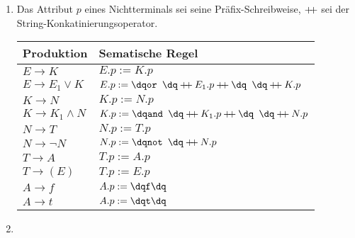 \documentclass[a4paper,10pt]{scrartcl}
\begin{document}
\section{}
\begin{enumerate}
 \item  Das Attribut $p$ eines Nichtterminals sei seine Präfix-Schreibweise, $\mathbin{+\mkern-5mu+}$ sei der String-Konkatinierungsoperator.
        \begin{center}
            \begin{tabular}{l|l}
                \textbf{Produktion} & \textbf{Sematische Regel} \\\hline
                $E \to K$                       & $E.p := K.p$ \\
                $E \to E_1 \lor K$              & $E.p := \str{or } \concat E_1.p \concat \str{ } \concat K.p$ \\
                $K \to N$                       & $K.p := N.p$ \\
                $K \to K_1 \land N$             & $K.p := \str{and } \concat K_1.p \concat \str{ } \concat N.p$\\
                $N \to T$                       & $N.p := T.p$\\
                $N \to \neg N$                  & $N.p := \str{not } \concat N.p$\\
                $T \to A$                       & $T.p := A.p$\\
                $T \to (E)$                     & $T.p := E.p$\\
                $A \to f$                       & $A.p := \str{f}$\\
                $A \to t$                       & $A.p := \str{t}$\\
            \end{tabular}
        \end{center}
 \item  \hspace{0cm}\\
        \begin{center}
\end{center}
\end{enumerate}
\end{document}
